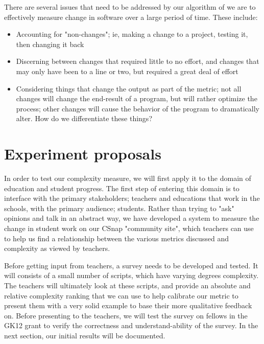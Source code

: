 \documentclass[]{article}
\begin{document}
There are several issues that need to be addressed by our algorithm of we are to effectively measure change in software over a large period of time.
These include:
\begin{itemize}
	\item Accounting for "non-changes"; ie, making a change to a project, testing it, then changing it back
	\item Discerning between changes that required little to no effort, and changes that may only have been to a line or two, but required a great deal of effort
	\item Considering things that change the output as part of the metric; not all changes will change the end-result of a program, but will rather optimize the process; other changes will cause the behavior of the program to dramatically alter. How do we differentiate these things?
\end{itemize}

\section{Experiment proposals}


In order to test our complexity measure, we will first apply it to the domain of education and student progress.
The first step of entering this domain is to interface with the primary stakeholders; teachers and educations that work in the schools, with the primary audience; students.
Rather than trying to "ask" opinions and talk in an abstract way, we have developed a system to measure the change in student work on our CSnap "community site", which teachers can use to help us find a relationship between the various metrics discussed and complexity as viewed by teachers.

Before getting input from teachers, a survey needs to be developed and tested.
It will consists of a small number of scripts, which have varying degrees complexity.
The teachers will ultimately look at these scripts, and provide an absolute and relative complexity ranking that we can use to help calibrate our metric to present them with a very solid example to base their more qualitative feedback on.
Before presenting to the teachers, we will test the survey on fellows in the GK12 grant to verify the correctness and understand-ability of the survey.
In the next section, our initial results will be documented.
\end{document}
